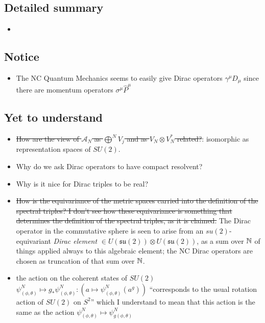 \documentclass{article}
\newcommand{\sut}{\ensuremath{\mathfrak{su}(2)}}
\begin{document}
\subsection{Detailed summary}

    \begin{itemize}

    \item 
    
    \end{itemize}

\subsection{Notice}

    \begin{itemize}

    \item The NC Quantum Mechanics seems to easily give Dirac operators $\gamma^\mu D_\mu$ since there are momentum operators $\sigma^\mu \hat P^\mu$
    
    \end{itemize}

\subsection{Yet to understand}

    \begin{itemize}

    \item \sout{How are the view of $\mathcal A_N$ as $\bigoplus^N V_j$ and as $V_{N} \otimes V_N^*$ related?}: isomorphic as representation spaces of $SU(2)$.
    
    \item Why do we ask Dirac operators to have compact resolvent?
    
    \item Why is it nice for Dirac triples to be real?
    
    \item \sout{How is the equivariance of the metric spaces carried into the definition of the spectral triples? I don't see how these equivariance is something that determines the definition of the spectral triples, as it is claimed.} The Dirac operator in the commutative sphere is seen to arise from an $su(2)$-equivariant \textit{Dirac element} $\in U(\sut)\otimes U(\sut)$, as a sum over $\mathbb{N}$ of things applied always to this algebraic element; the NC Dirac operators are chosen as truncation of that sum over $\mathbb{N}$.
    
    \item {} the action on the coherent states of $SU(2)$ $\psi^N_{(\phi, \theta)} \mapsto g_*\psi^N_{(\phi, \theta)}:(a \mapsto \psi^N_{(\phi, \theta)}(a^g))$ ``corresponds to the usual rotation action of $SU(2)$ on $S^2$'' which I understand to mean that this action is the same as the action $\psi^N_{(\phi, \theta)} \mapsto \psi^N_{g(\phi, \theta)}$
    
    \end{itemize}
\end{document}
